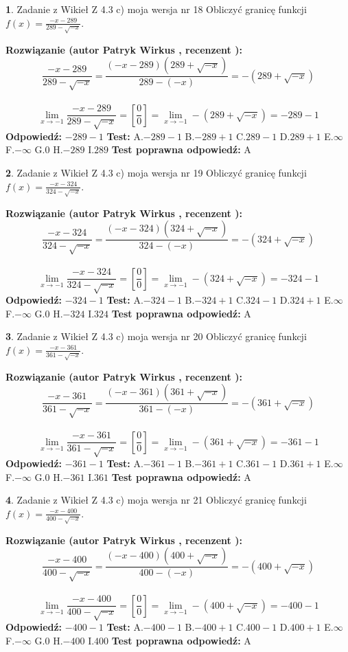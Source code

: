 \documentclass[12pt, a4paper]{article}
\theoremstyle{definition} %
\newtheorem{zad}{}
\newcommand{\zadStart}[1]{\begin{zad}#1\newline}
\newcommand{\zadStop}{\end{zad}}
\newcommand{\rozwStart}[2]{\noindent \textbf{Rozwiązanie (autor #1 , recenzent #2): }\newline}
\newcommand{\rozwStop}{\newline}
\newcommand{\odpStart}{\noindent \textbf{Odpowiedź:}\newline}
\newcommand{\odpStop}{\newline}
\newcommand{\testStart}{\noindent \textbf{Test:}\newline}
\newcommand{\testStop}{\newline}
\newcommand{\kluczStart}{\noindent \textbf{Test poprawna odpowiedź:}\newline}
\newcommand{\kluczStop}{\newline}
\begin{document}
\zadStart{Zadanie z Wikieł Z 4.3 c) moja wersja nr 18}
Obliczyć granicę funkcji $f(x)=\frac{-x-289}{289-\sqrt{-x}}$.
\zadStop
\rozwStart{Patryk Wirkus}{}
$$\frac{-x-289}{289-\sqrt{-x}}=\frac{(-x-289)(289+\sqrt{-x})}{289-(-x)}=-(289+\sqrt{-x})$$
\\
$$\lim\limits_{x\to-1}\frac{-x-289}{289-\sqrt{-x}}=[\frac{0}{0}]=\lim\limits_{x\to-1}-(289+\sqrt{-x}) =-289-1$$
\rozwStop
\odpStart
$-289-1$
\odpStop
\testStart
A.$-289-1$
B.$-289+1$
C.$289-1$
D.$289+1$
E.$\infty$
F.$-\infty$
G.$0$
H.$-289$
I.$289$
\testStop
\kluczStart
A
\kluczStop



\zadStart{Zadanie z Wikieł Z 4.3 c) moja wersja nr 19}
Obliczyć granicę funkcji $f(x)=\frac{-x-324}{324-\sqrt{-x}}$.
\zadStop
\rozwStart{Patryk Wirkus}{}
$$\frac{-x-324}{324-\sqrt{-x}}=\frac{(-x-324)(324+\sqrt{-x})}{324-(-x)}=-(324+\sqrt{-x})$$
\\
$$\lim\limits_{x\to-1}\frac{-x-324}{324-\sqrt{-x}}=[\frac{0}{0}]=\lim\limits_{x\to-1}-(324+\sqrt{-x}) =-324-1$$
\rozwStop
\odpStart
$-324-1$
\odpStop
\testStart
A.$-324-1$
B.$-324+1$
C.$324-1$
D.$324+1$
E.$\infty$
F.$-\infty$
G.$0$
H.$-324$
I.$324$
\testStop
\kluczStart
A
\kluczStop



\zadStart{Zadanie z Wikieł Z 4.3 c) moja wersja nr 20}
Obliczyć granicę funkcji $f(x)=\frac{-x-361}{361-\sqrt{-x}}$.
\zadStop
\rozwStart{Patryk Wirkus}{}
$$\frac{-x-361}{361-\sqrt{-x}}=\frac{(-x-361)(361+\sqrt{-x})}{361-(-x)}=-(361+\sqrt{-x})$$
\\
$$\lim\limits_{x\to-1}\frac{-x-361}{361-\sqrt{-x}}=[\frac{0}{0}]=\lim\limits_{x\to-1}-(361+\sqrt{-x}) =-361-1$$
\rozwStop
\odpStart
$-361-1$
\odpStop
\testStart
A.$-361-1$
B.$-361+1$
C.$361-1$
D.$361+1$
E.$\infty$
F.$-\infty$
G.$0$
H.$-361$
I.$361$
\testStop
\kluczStart
A
\kluczStop



\zadStart{Zadanie z Wikieł Z 4.3 c) moja wersja nr 21}
Obliczyć granicę funkcji $f(x)=\frac{-x-400}{400-\sqrt{-x}}$.
\zadStop
\rozwStart{Patryk Wirkus}{}
$$\frac{-x-400}{400-\sqrt{-x}}=\frac{(-x-400)(400+\sqrt{-x})}{400-(-x)}=-(400+\sqrt{-x})$$
\\
$$\lim\limits_{x\to-1}\frac{-x-400}{400-\sqrt{-x}}=[\frac{0}{0}]=\lim\limits_{x\to-1}-(400+\sqrt{-x}) =-400-1$$
\rozwStop
\odpStart
$-400-1$
\odpStop
\testStart
A.$-400-1$
B.$-400+1$
C.$400-1$
D.$400+1$
E.$\infty$
F.$-\infty$
G.$0$
H.$-400$
I.$400$
\testStop
\kluczStart
A
\kluczStop
\end{document}
